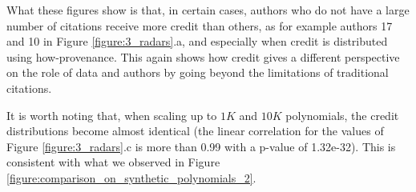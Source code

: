 What these figures show is that, in certain cases, authors who do not have a large number of citations receive more credit than others, as for example authors 17 and 10 in Figure \ref{figure:3_radars}.a, 
and especially when credit is distributed using how-provenance.
This again shows how credit gives a different perspective on the role of data and authors by going beyond the limitations of traditional citations.  

It is worth noting that, when scaling up to $1K$ and $10K$ polynomials, the credit distributions  become almost identical  
 (the linear correlation for the values of Figure \ref{figure:3_radars}.c is more than 0.99 with a p-value of 1.32e-32). This is consistent with what we observed in Figure \ref{figure:comparison_on_synthetic_polynomials_2}.


